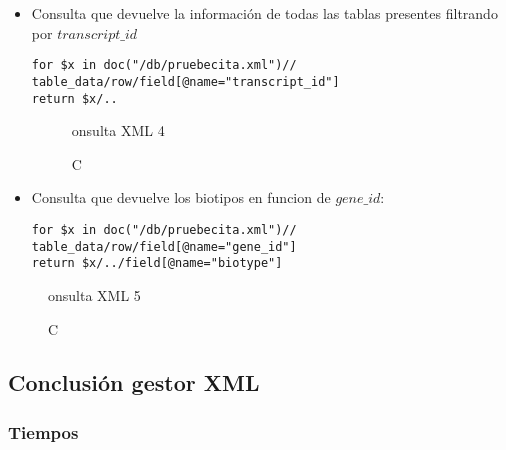 \documentclass[12pt,a4paper]{article}
\begin{document}
\begin{itemize}
\item Consulta que devuelve la información de todas las tablas presentes filtrando por
$transcript\_id$

\begin{verbatim}
for $x in doc("/db/pruebecita.xml")//
table_data/row/field[@name="transcript_id"]
return $x/..
\end{verbatim}

\begin{figure}[!h]
\centering
{}
\caption Consulta XML 4
\label{xml4}
\end{figure}


\item Consulta que devuelve los biotipos en funcion de $gene\_id:$
\begin{verbatim}
for $x in doc("/db/pruebecita.xml")//
table_data/row/field[@name="gene_id"]
return $x/../field[@name="biotype"]
\end{verbatim}
\end{itemize}

\begin{figure}[!h]
\centering
{}
\caption Consulta XML 5
\label{xml5}
\end{figure}


\newpage

\subsection{Conclusión gestor XML}  \label{pto43}

\subsubsection{Tiempos}  \label{pto431}
\end{document}
